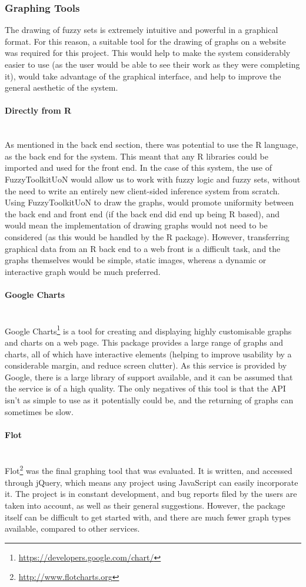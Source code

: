 \subsubsection{Graphing Tools}
The drawing of fuzzy sets is extremely intuitive and powerful in a graphical format. For this reason, a suitable tool for the drawing of graphs on a website was required for this project. This would help to make the system considerably easier to use (as the user would be able to see their work as they were completing it), would take advantage of the graphical interface, and help to improve the general aesthetic of the system. 
\paragraph{Directly from R}\ \\
As mentioned in the back end section, there was potential to use the R language, as the back end for the system. This meant that any R libraries could be imported and used for the front end. In the case of this system, the use of FuzzyToolkitUoN would allow us to work with fuzzy logic and fuzzy sets, without the need to write an entirely new client-sided inference system from scratch. Using FuzzyToolkitUoN to draw the graphs, would promote uniformity between the back end and front end (if the back end did end up being R based), and would mean the implementation of drawing graphs would not need to be considered (as this would be handled by the R package). However, transferring graphical data from an R back end to a web front is a difficult task, and the graphs themselves would be simple, static images, whereas a dynamic or interactive graph would be much preferred.

\paragraph{Google Charts}\ \\
Google Charts\footnote{\url{https://developers.google.com/chart/}} is a tool for creating and displaying highly customisable graphs and charts on a web page. This package provides a large range of graphs and charts, all of which have interactive elements (helping to improve usability by a considerable margin, and reduce screen clutter). As this service is provided by Google, there is a large library of support available, and it can be assumed that the service is of a high quality. The only negatives of this tool is that the API isn't as simple to use as it potentially could be, and the returning of graphs can sometimes be slow.

\paragraph{Flot}\ \\
Flot\footnote{\url{http://www.flotcharts.org}} was the final graphing tool that was evaluated. It is written, and accessed through jQuery, which means any project using JavaScript can easily incorporate it. The project is in constant development, and bug reports filed by the users are taken into account, as well as their general suggestions. However, the package itself can be difficult to get started with, and there are much fewer graph types available, compared to other services.